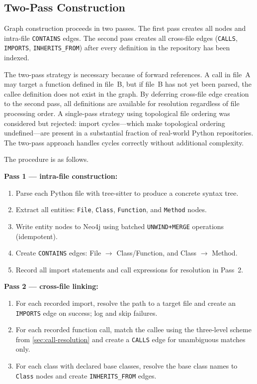 \subsection{Two-Pass Construction}
\label{sec:two-pass}

Graph construction proceeds in two passes. The first pass creates all nodes and intra-file \texttt{CONTAINS} edges. The second pass creates all cross-file edges (\texttt{CALLS}, \texttt{IMPORTS}, \texttt{INHERITS\_FROM}) after every definition in the repository has been indexed.

The two-pass strategy is necessary because of forward references. A call in file~A may target a function defined in file~B, but if file~B has not yet been parsed, the callee definition does not exist in the graph. By deferring cross-file edge creation to the second pass, all definitions are available for resolution regardless of file processing order. A single-pass strategy using topological file ordering was considered but rejected: import cycles---which make topological ordering undefined---are present in a substantial fraction of real-world Python repositories. The two-pass approach handles cycles correctly without additional complexity.

The procedure is as follows.

\noindent\textbf{Pass 1 --- intra-file construction:}
\begin{enumerate}[leftmargin=*, itemsep=3pt]
    \item Parse each Python file with tree-sitter to produce a concrete syntax tree.
    \item Extract all entities: \texttt{File}, \texttt{Class}, \texttt{Function}, and \texttt{Method} nodes.
    \item Write entity nodes to Neo4j using batched \texttt{UNWIND+MERGE} operations (idempotent).
    \item Create \texttt{CONTAINS} edges: File $\to$ Class/Function, and Class $\to$ Method.
    \item Record all import statements and call expressions for resolution in Pass~2.
\end{enumerate}

\noindent\textbf{Pass 2 --- cross-file linking:}
\begin{enumerate}[leftmargin=*, itemsep=3pt]
    \item For each recorded import, resolve the path to a target file and create an \texttt{IMPORTS} edge on success; log and skip failures.
    \item For each recorded function call, match the callee using the three-level scheme from \cref{sec:call-resolution} and create a \texttt{CALLS} edge for unambiguous matches only.
    \item For each class with declared base classes, resolve the base class names to \texttt{Class} nodes and create \texttt{INHERITS\_FROM} edges.
\end{enumerate}

